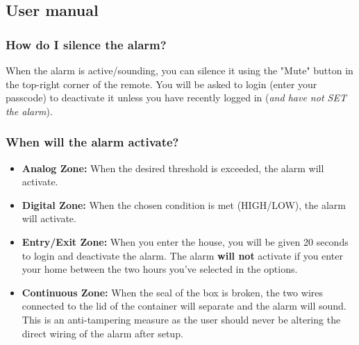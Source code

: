 \documentclass[a4paper,11pt]{article}
\theoremstyle{mytheor}
\begin{document}
\subsection{User manual}

\subsubsection{How do I silence the alarm?}
When the alarm is active/sounding, you can silence it using the "Mute" button in the top-right corner of the remote. You will be asked to login (enter your passcode) to deactivate it unless you have recently logged in (\textit{and have not SET the alarm}).

\subsubsection{When will the alarm activate?}
\begin{itemize}
    \item \textbf{Analog Zone:} When the desired threshold is exceeded, the alarm will activate.
    \item \textbf{Digital Zone:} When the chosen condition is met (HIGH/LOW), the alarm will activate.
    \item \textbf{Entry/Exit Zone:} When you enter the house, you will be given 20 seconds to login and deactivate the alarm. The alarm \textbf{will not} activate if you enter your home between the two hours you've selected in the options.
    \item \textbf{Continuous Zone:} When the seal of the box is broken, the two wires connected to the lid of the container will separate and the alarm will sound. This is an anti-tampering measure as the user should never be altering the direct wiring of the alarm after setup.
\end{itemize}
\end{document}
